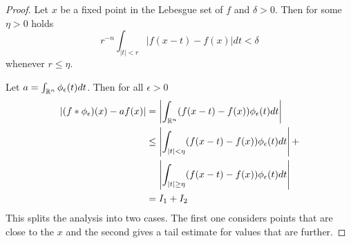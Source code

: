 \begin{proof}
    Let $x$ be a fixed point in the Lebesgue set of $f$ and $\delta>0$. Then for some $\eta>0$ holds
    \begin{equation}\label{eq:cond-i}
        r^{-n}\int_{|t|<r}|f(x-t)-f(x)|dt<\delta
    \end{equation}
    whenever $r\leq\eta$.
    
    Let $a=\int_{\mathbb R^n}\phi_\epsilon(t)dt$. Then for all $\epsilon>0$
    \begin{align*}
        |(f*\phi_\epsilon)(x)-af(x)|&=\left|\int_{\mathbb R^n}(f(x-t)-f(x))\phi_\epsilon(t)dt \right| \\
        &\leq \left|\int_{|t|<\eta}(f(x-t)-f(x))\phi_\epsilon(t)dt \right|+\\
        &\quad\,\left|\int_{|t|\geq\eta}(f(x-t)-f(x))\phi_\epsilon(t)dt \right| \\
        &=I_1 + I_2
    \end{align*}
    This splits the analysis into two cases. The first one considers points that are close to the $x$ and the second gives a tail estimate for values that are further. 
    

\end{proof}
